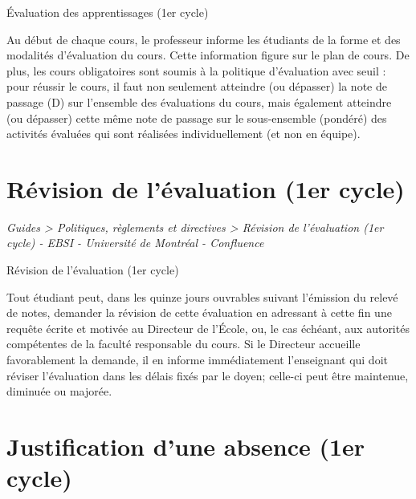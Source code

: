 \documentclass [12 pt]{article}
\begin{document}
        Évaluation des apprentissages (1er cycle)
        
            Au début de chaque cours, le professeur informe les étudiants de la forme et des
                modalités d'évaluation du cours. Cette information figure sur le plan de cours.
            De plus, les cours obligatoires sont soumis à la politique d'évaluation avec
                    seuil : pour réussir le cours, il faut non seulement atteindre (ou
                dépasser) la note de passage (D) sur l'ensemble des évaluations du cours, mais
                également atteindre (ou dépasser) cette même note de passage sur le sous-ensemble
                (pondéré) des activités évaluées qui sont réalisées individuellement (et non en
                équipe).
        
    
    
        \newpage
        \section {
        Révision de l'évaluation (1er cycle)
        }
        
        
        
        \textit{
        Guides > Politiques, règlements et directives > Révision de l'évaluation
            (1er cycle) - EBSI - Université de Montréal - Confluence
        }
    
        Révision de l'évaluation (1er cycle)
        
            Tout étudiant peut, dans les quinze jours ouvrables suivant l'émission du relevé de
                notes, demander la révision de cette évaluation en adressant à cette fin une requête
                écrite et motivée au Directeur de l'École, ou, le cas échéant, aux autorités
                compétentes de la faculté responsable du cours.
            Si le Directeur accueille favorablement la demande, il en informe immédiatement
                l'enseignant qui doit réviser l'évaluation dans les délais fixés par le doyen;
                celle-ci peut être maintenue, diminuée ou majorée.
        
    
    
        \newpage
        \section {
        Justification d'une absence (1er cycle)
        }
        
        
        
\end{document}

